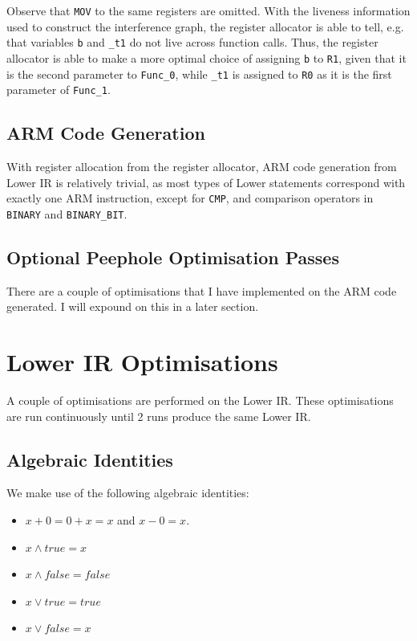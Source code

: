 \documentclass[nonacm, acmsmall, screen, 10pt]{acmart}
\begin{document}
Observe that \texttt{MOV} to the same registers are omitted.
With the liveness information used to construct the interference graph, the register allocator is able to tell, e.g. that variables \texttt{b} and \texttt{\_t1} do not live across function calls.
Thus, the register allocator is able to make a more optimal choice of assigning \texttt{b} to \texttt{R1}, given that it is the second parameter to \texttt{Func\_0}, while \texttt{\_t1} is assigned to \texttt{R0} as it is the first parameter of \texttt{Func\_1}.

\subsection{ARM Code Generation}
With register allocation from the register allocator, ARM code generation from Lower IR is relatively trivial, as most types of Lower statements correspond with exactly one ARM instruction, except for \texttt{CMP}, and comparison operators in \texttt{BINARY} and \texttt{BINARY\_BIT}.

\subsection{Optional Peephole Optimisation Passes}
There are a couple of optimisations that I have implemented on the ARM code generated.
I will expound on this in a later section.

\section{Lower IR Optimisations}
A couple of optimisations are performed on the Lower IR.
These optimisations are run continuously until 2 runs produce the same Lower IR.

\subsection{Algebraic Identities}
We make use of the following algebraic identities:
\begin{itemize}
  \item $x + 0 = 0 + x = x$ and $x - 0 = x$.
  \item $x \land true = x$
  \item $x \land false = false$
  \item $x \lor true = true$
  \item $x \lor false = x$
\end{itemize}
\end{document}
